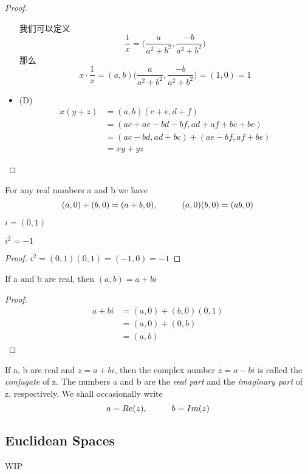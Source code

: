 \documentclass[../poma-note.tex]{subfiles}
\begin{document}
\begin{proof}
\begin{itemize}
			我们可以定义
			\[\frac{1}{x} = \bigl(\frac{a}{a^2+b^2}, \frac{-b}{a^2+b^2}\bigr)\]
			那么
			\[x \cdot \frac{1}{x} = (a,b)\bigl(\frac{a}{a^2+b^2}, \frac{-b}{a^2+b^2}\bigr) = (1,0) = 1\]
		\item[] (D)
			\vspace{-26pt}
			\begin{align*}
				\mathcal{} x(y+z) & = (a,b)(c+e,d+f)                \\
				                  & = (ac+ae-bd-bf,ad+af+bc+be)     \\
				                  & = (ac-bd,ad+bc) + (ae-bf,af+be) \\
				                  & = xy + yz
			\end{align*}
	\end{itemize}
\end{proof}

\begin{theorem}
	For any real numbers a and b we have
	\[(a,0) + (b,0) = (a+b,0), \hspace*{1cm} (a,0)(b,0) = (ab,0)\]
\end{theorem}

\setcounter{definition}{26}
\begin{definition}
	$i=(0,1)$
\end{definition}

\setcounter{theorem}{27}
\begin{theorem}
	$i^2=-1$
\end{theorem}

\begin{proof}
	$i^2 = (0,1)(0,1) = (-1,0) = -1$
\end{proof}

\begin{theorem}
	If a and b are real, then $(a,b)=a+bi$
\end{theorem}

\begin{proof}
	\vspace{-26pt}
	\begin{align*}
		\mathcal{} a+bi & = (a,0) + (b,0)(0,1) \\
		                & = (a,0) + (0,b)      \\
		                & = (a,b)
	\end{align*}
\end{proof}

\setcounter{definition}{29}
\begin{definition}
	If a, b are real and $z=a+bi$, then the complex number $\overline{z}=a-bi$ is called the \textit{conjugate} of z.
	The numbers a and b are the \textit{real part} and the \textit{imaginary part} of z, respectively.
	We shall occasionally write
	\[ a = Re(z),\hspace*{1cm} b=Im(z)\]
\end{definition}


\subsection*{Euclidean Spaces}

WIP
\end{document}

